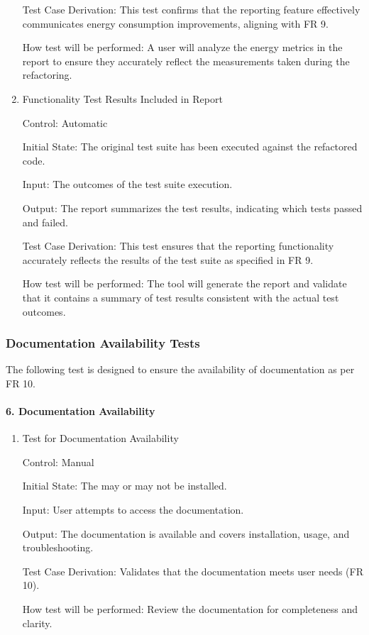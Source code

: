 \documentclass[12pt, titlepage]{article}
\begin{document}
\begin{enumerate}
Test Case Derivation: This test confirms that the reporting feature effectively communicates energy consumption improvements, aligning with FR 9.

How test will be performed: A user will analyze the energy metrics in the report to ensure they accurately reflect the measurements taken during the refactoring.


\item{Functionality Test Results Included in Report\\}

Control: Automatic

Initial State: The original test suite has been executed against the refactored code.

Input: The outcomes of the test suite execution.

Output: The report summarizes the test results, indicating which tests passed and failed.

Test Case Derivation: This test ensures that the reporting functionality accurately reflects the results of the test suite as specified in FR 9.

How test will be performed: The tool will generate the report and validate that it contains a summary of test results consistent with the actual test outcomes.

\end{enumerate}


\subsubsection{Documentation Availability Tests}

The following test is designed to ensure the availability of documentation as per FR 10.
		
\paragraph{6. Documentation Availability}
\begin{enumerate}
  \item{Test for Documentation Availability\\}

  Control: Manual
  
  Initial State: The may or may not be installed.
  
  Input: User attempts to access the documentation.
  
  Output: The documentation is available and covers installation, usage, and troubleshooting.
  
  Test Case Derivation: Validates that the documentation meets user needs (FR 10).
  
  How test will be performed: Review the documentation for completeness and clarity.
\end{enumerate}
\end{document}
